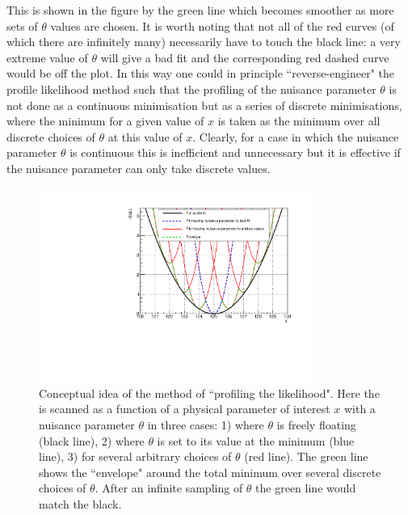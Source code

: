 This is shown in the figure by the green line which becomes smoother as more sets of $\theta$ values are chosen. It is worth noting that not all of the red curves (of which there are infinitely many) necessarily have to touch the black line: a very extreme value of $\theta$ will give a bad fit and the corresponding red dashed curve would be off the plot. In this way one could in principle ``reverse-engineer" the profile likelihood method such that the profiling of the nuisance parameter $\theta$ is not done as a continuous minimisation but as a series of discrete minimisations, where the minimum \NLL for a given value of $x$ is taken as the minimum \NLL over all discrete choices of $\theta$ at this value of $x$. Clearly, for a case in which the nuisance parameter $\theta$ is continuous this is inefficient and unnecessary but it is effective if the nuisance parameter can only take discrete values.

\begin{figure}
\begin{center}
  \includegraphics[width=0.8\textwidth]{analysis/plots/envelope_explain.pdf}
  \caption[Conceptual idea of the method of likelihood profiling]{Conceptual idea of the method of ``profiling the likelihood". Here the \NLL is scanned as a function of a physical parameter of interest $x$ with a nuisance parameter $\theta$ in three cases: 1) where $\theta$ is freely floating (black line), 2) where $\theta$ is set to its value at the \NLL minimum (blue line), 3) for several arbitrary choices of $\theta$ (red line). The green line shows the ``envelope" around the total minimum over several discrete choices of $\theta$. After an infinite sampling of $\theta$ the green line would match the black.}
  \label{fig:envelope_explain1}
\end{center}
\end{figure}

